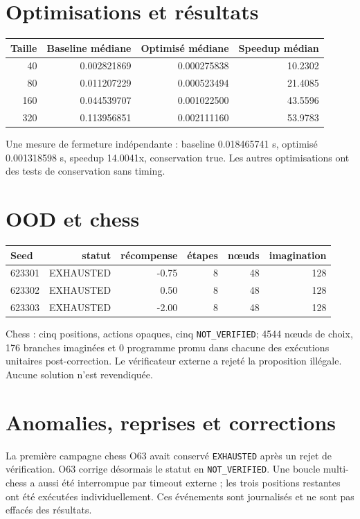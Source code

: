 \documentclass[11pt,a4paper]{article}
\newcommand{\code}[1]{\texttt{#1}}
\begin{document}
\section{Optimisations et résultats}
\begin{longtable}{rrrr}
\toprule
Taille & Baseline médiane & Optimisé médiane & Speedup médian\\
\midrule
40 & 0.002821869 & 0.000275838 & 10.2302\\
80 & 0.011207229 & 0.000523494 & 21.4085\\
160 & 0.044539707 & 0.001022500 & 43.5596\\
320 & 0.113956851 & 0.002111160 & 53.9783\\
\bottomrule
\end{longtable}
Une mesure de fermeture indépendante : baseline 0.018465741 s, optimisé 0.001318598 s, speedup 14.0041x, conservation true. Les autres optimisations ont des tests de conservation sans timing.

\section{OOD et chess}
\begin{longtable}{lrrrrr}
\toprule
Seed & statut & récompense & étapes & nœuds & imagination\\
\midrule
623301 & EXHAUSTED & -0.75 & 8 & 48 & 128\\
623302 & EXHAUSTED & 0.50 & 8 & 48 & 128\\
623303 & EXHAUSTED & -2.00 & 8 & 48 & 128\\
\bottomrule
\end{longtable}
Chess : cinq positions, actions opaques, cinq \code{NOT\_VERIFIED}; 4544 nœuds de choix, 176 branches imaginées et 0 programme promu dans chacune des exécutions unitaires post-correction. Le vérificateur externe a rejeté la proposition illégale. Aucune solution n’est revendiquée.

\section{Anomalies, reprises et corrections}
La première campagne chess O63 avait conservé \code{EXHAUSTED} après un rejet de vérification. O63 corrige désormais le statut en \code{NOT\_VERIFIED}. Une boucle multi-chess a aussi été interrompue par timeout externe ; les trois positions restantes ont été exécutées individuellement. Ces événements sont journalisés et ne sont pas effacés des résultats.
\end{document}
